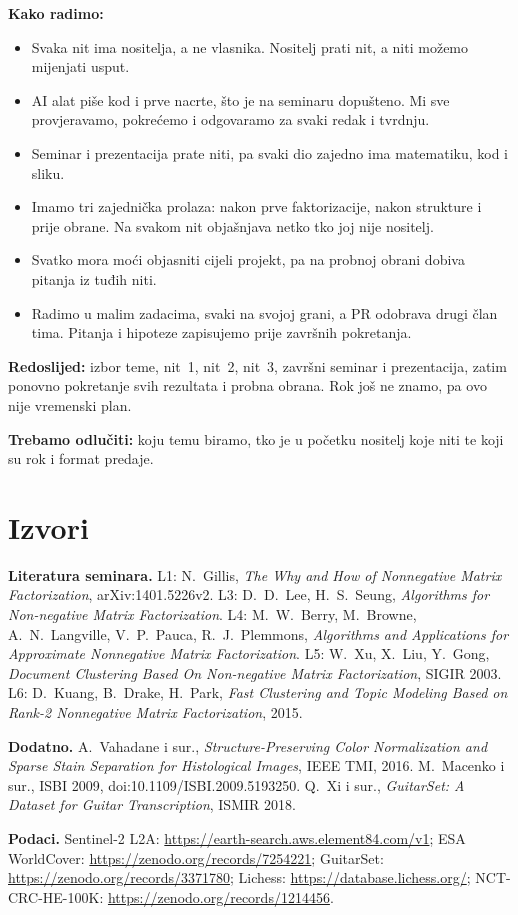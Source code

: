 \documentclass[10pt,a4paper]{article}
\begin{document}
\textbf{Kako radimo:}
\begin{itemize}
\item Svaka nit ima nositelja, a ne vlasnika. Nositelj prati nit, a niti možemo mijenjati usput.
\item AI alat piše kod i prve nacrte, što je na seminaru dopušteno. Mi sve provjeravamo, pokrećemo i odgovaramo za svaki redak i tvrdnju.
\item Seminar i prezentacija prate niti, pa svaki dio zajedno ima matematiku, kod i sliku.
\item Imamo tri zajednička prolaza: nakon prve faktorizacije, nakon strukture i prije obrane. Na svakom nit objašnjava netko tko joj nije nositelj.
\item Svatko mora moći objasniti cijeli projekt, pa na probnoj obrani dobiva pitanja iz tuđih niti.
\item Radimo u malim zadacima, svaki na svojoj grani, a PR odobrava drugi član tima. Pitanja i hipoteze zapisujemo prije završnih pokretanja.
\end{itemize}

\textbf{Redoslijed:} izbor teme, nit~1, nit~2, nit~3, završni seminar i prezentacija, zatim ponovno
pokretanje svih rezultata i probna obrana. Rok još ne znamo, pa ovo nije vremenski plan.

\textbf{Trebamo odlučiti:} koju temu biramo, tko je u početku nositelj koje niti te koji su rok i format predaje.

\section*{Izvori}
{\footnotesize\raggedright
\textbf{Literatura seminara.}
L1: N.~Gillis, \emph{The Why and How of Nonnegative Matrix Factorization}, arXiv:1401.5226v2.
L3: D.~D.~Lee, H.~S.~Seung, \emph{Algorithms for Non-negative Matrix Factorization}.
L4: M.~W.~Berry, M.~Browne, A.~N.~Langville, V.~P.~Pauca, R.~J.~Plemmons, \emph{Algorithms and Applications for Approximate Nonnegative Matrix Factorization}.
L5: W.~Xu, X.~Liu, Y.~Gong, \emph{Document Clustering Based On Non-negative Matrix Factorization}, SIGIR 2003.
L6: D.~Kuang, B.~Drake, H.~Park, \emph{Fast Clustering and Topic Modeling Based on Rank-2 Nonnegative Matrix Factorization}, 2015.

\textbf{Dodatno.}
A.~Vahadane i sur., \emph{Structure-Preserving Color Normalization and Sparse Stain Separation for Histological Images}, IEEE TMI, 2016.
M.~Macenko i sur., ISBI 2009, doi:10.1109/ISBI.2009.5193250.
Q.~Xi i sur., \emph{GuitarSet: A Dataset for Guitar Transcription}, ISMIR 2018.

\textbf{Podaci.}
Sentinel-2 L2A: \url{https://earth-search.aws.element84.com/v1};
ESA WorldCover: \url{https://zenodo.org/records/7254221};
GuitarSet: \url{https://zenodo.org/records/3371780};
Lichess: \url{https://database.lichess.org/};
NCT-CRC-HE-100K: \url{https://zenodo.org/records/1214456}.
\par}
\end{document}
